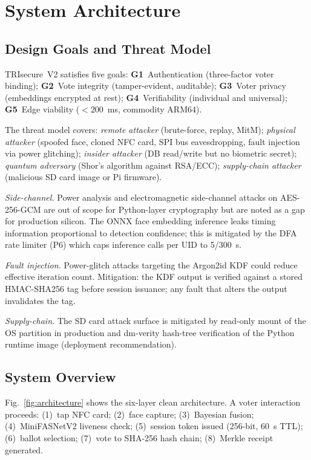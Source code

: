 \documentclass[conference]{IEEEtran}
\begin{document}
\section{System Architecture}
\label{sec:architecture}

\subsection{Design Goals and Threat Model}

TRIsecure~V2 satisfies five goals:
\textbf{G1}~Authentication (three-factor voter binding);
\textbf{G2}~Vote integrity (tamper-evident, auditable);
\textbf{G3}~Voter privacy (embeddings encrypted at rest);
\textbf{G4}~Verifiability (individual and universal);
\textbf{G5}~Edge viability (\(<200\)~ms, commodity ARM64).

The threat model covers: \textit{remote attacker} (brute-force, replay,
MitM); \textit{physical attacker} (spoofed face, cloned NFC card, SPI bus
eavesdropping, fault injection via power glitching);
\textit{insider attacker} (DB read/write but no biometric secret);
\textit{quantum adversary} (Shor's algorithm against RSA/ECC);
\textit{supply-chain attacker} (malicious SD card image or Pi firmware).

\textit{Side-channel.} Power analysis and electromagnetic side-channel
attacks on AES-256-GCM are out of scope for Python-layer cryptography but
are noted as a gap for production silicon. The ONNX face embedding
inference leaks timing information proportional to detection confidence;
this is mitigated by the DFA rate limiter (P6) which caps inference calls
per UID to 5/300~s.

\textit{Fault injection.} Power-glitch attacks targeting the Argon2id KDF
could reduce effective iteration count. Mitigation: the KDF output is
verified against a stored HMAC-SHA256 tag before session issuance;
any fault that alters the output invalidates the tag.

\textit{Supply-chain.} The SD card attack surface is mitigated by read-only
mount of the OS partition in production and dm-verity hash-tree verification
of the Python runtime image (deployment recommendation).

\subsection{System Overview}

Fig.~\ref{fig:architecture} shows the six-layer clean architecture.
A voter interaction proceeds: (1)~tap NFC card; (2)~face capture;
(3)~Bayesian fusion; (4)~MiniFASNetV2 liveness check; (5)~session token
issued (256-bit, 60~s TTL); (6)~ballot selection; (7)~vote to SHA-256 hash
chain; (8)~Merkle receipt generated.
\end{document}
